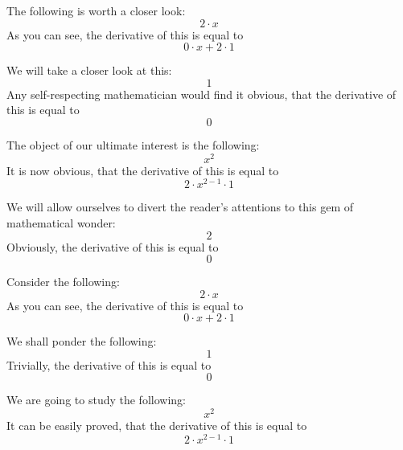 \documentclass{article}
\begin{document}
The following is worth a closer look:
\begin{equation}
2 \cdot x 
\end{equation}
As you can see, the derivative of this is equal to
\begin{equation}
0 \cdot x + 2 \cdot 1 
\end{equation}

We will take a closer look at this:
\begin{equation}
1 
\end{equation}
Any self-respecting mathematician would find it obvious, that the derivative of this is equal to
\begin{equation}
0 
\end{equation}

The object of our ultimate interest is the following:
\begin{equation}
x ^{2 } 
\end{equation}
It is now obvious, that the derivative of this is equal to
\begin{equation}
2 \cdot x ^{2 - 1 } \cdot 1 
\end{equation}

We will allow ourselves to divert the reader's attentions to this gem of mathematical wonder:
\begin{equation}
2 
\end{equation}
Obviously, the derivative of this is equal to
\begin{equation}
0 
\end{equation}

Consider the following:
\begin{equation}
2 \cdot x 
\end{equation}
As you can see, the derivative of this is equal to
\begin{equation}
0 \cdot x + 2 \cdot 1 
\end{equation}

We shall ponder the following:
\begin{equation}
1 
\end{equation}
Trivially, the derivative of this is equal to
\begin{equation}
0 
\end{equation}

We are going to study the following:
\begin{equation}
x ^{2 } 
\end{equation}
It can be easily proved, that the derivative of this is equal to
\begin{equation}
2 \cdot x ^{2 - 1 } \cdot 1 
\end{equation}
\end{document}
